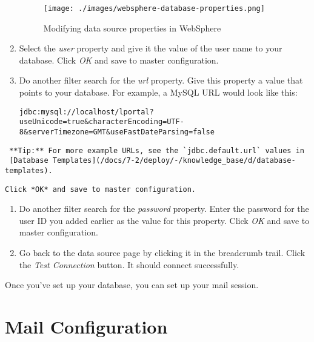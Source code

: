 \begin{enumerate}
  \begin{figure}
  \centering
  \texttt{[image: ./images/websphere-database-properties.png]}
  \caption{Modifying data source properties in WebSphere}
  \end{figure}
\item
  Select the \emph{user} property and give it the value of the user name
  to your database. Click \emph{OK} and save to master configuration.
\item
  Do another filter search for the \emph{url} property. Give this
  property a value that points to your database. For example, a MySQL
  URL would look like this:

\begin{verbatim}
jdbc:mysql://localhost/lportal?useUnicode=true&characterEncoding=UTF-8&serverTimezone=GMT&useFastDateParsing=false
\end{verbatim}
\end{enumerate}

\noindent\hrulefill

\begin{verbatim}
 **Tip:** For more example URLs, see the `jdbc.default.url` values in
 [Database Templates](/docs/7-2/deploy/-/knowledge_base/d/database-templates).
\end{verbatim}

\noindent\hrulefill

\begin{verbatim}
Click *OK* and save to master configuration.
\end{verbatim}

\begin{enumerate}
\def\labelenumi{\arabic{enumi}.}
\setcounter{enumi}{14}
\item
  Do another filter search for the \emph{password} property. Enter the
  password for the user ID you added earlier as the value for this
  property. Click \emph{OK} and save to master configuration.
\item
  Go back to the data source page by clicking it in the breadcrumb
  trail. Click the \emph{Test Connection} button. It should connect
  successfully.
\end{enumerate}

Once you've set up your database, you can set up your mail session.

\section{Mail Configuration}\label{mail-configuration-2}

